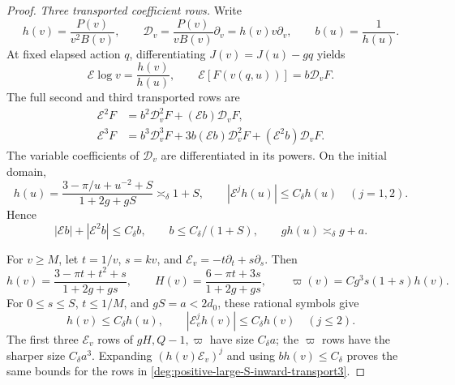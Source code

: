 \begin{proof}
\smallskip
\noindent\emph{Three transported coefficient rows.}
Write
\[
 h(v)=\frac{P(v)}{v^2B(v)},\qquad
 {\mathcal D}_v=\frac{P(v)}{vB(v)}\partial_v=h(v)v\partial_v,\qquad
 b(u)=\frac1{h(u)} .
\]
At fixed elapsed action \(q\), differentiating
\(J(v)=J(u)-gq\) yields
\begin{equation}\label{deg:positive-large-S-inward-transport}
 {\mathcal E}\log v=\frac{h(v)}{h(u)},\qquad
 {\mathcal E}[F(v(q,u))]=b{\mathcal D}_vF .
\end{equation}
The full second and third transported rows are
\begin{equation}\label{deg:positive-large-S-inward-transport3}
\begin{split}
 {\mathcal E}^2F&=b^2{\mathcal D}_v^2F+({\mathcal E} b){\mathcal D}_vF,\\
 {\mathcal E}^3F&=b^3{\mathcal D}_v^3F+3b({\mathcal E} b){\mathcal D}_v^2F+({\mathcal E}^2b){\mathcal D}_vF .
\end{split}
\end{equation}
The variable coefficients of \({\mathcal D}_v\) are differentiated in its
powers. On the initial domain,
\begin{equation}\label{deg:positive-large-S-inward-initial-speed}
 h(u)=\frac{3-\pi/u+u^{-2}+S}{1+2g+gS}
       \asymp_\delta1+S,\qquad
 |{\mathcal E}^jh(u)|\le C_\delta h(u)\quad(j=1,2).
\end{equation}
Hence
\[
 |{\mathcal E} b|+|{\mathcal E}^2b|\le C_\delta b,\qquad
 b\le C_\delta/(1+S),\qquad
 gh(u)\asymp_\delta g+a .
\]

For \(v\ge M\), let \(t=1/v\), \(s=kv\), and
\({\mathcal E}_v=-t\partial_t+s\partial_s\). Then
\begin{equation}\label{deg:positive-large-S-inward-rational-symbols}
 h(v)=\frac{3-\pi t+t^2+s}{1+2g+gs},\qquad
 H(v)=\frac{6-\pi t+3s}{1+2g+gs},\qquad
 \varpi(v)=Cg^3s(1+s)h(v).
\end{equation}
For \(0\le s\le S\), \(t\le1/M\), and \(gS=a<2d_0\),
these rational symbols give
\[
 h(v)\le C_\delta h(u),\qquad
 |{\mathcal E}_v^jh(v)|\le C_\delta h(v)\quad(j\le2).
\]
The first three \({\mathcal E}_v\) rows of \(gH,Q-1,\varpi\) have
size \(C_\delta a\); the \(\varpi\) rows have the sharper
size \(C_\delta a^3\). Expanding \((h(v){\mathcal E}_v)^j\) and
using \(b h(v)\le C_\delta\) proves the same bounds for
the rows in \eqref{deg:positive-large-S-inward-transport3}.


\end{proof}
